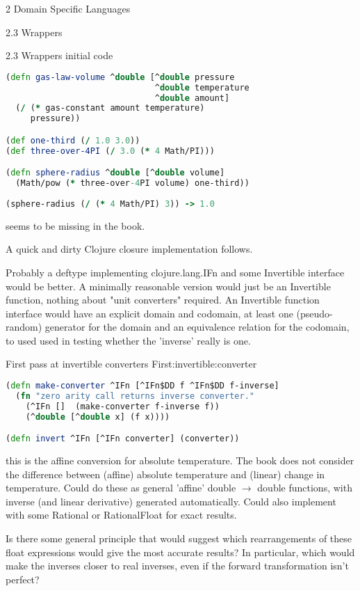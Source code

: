 \documentclass[12pt]{PalisadesLakesBook}
\begin{document}
\begin{plSection}{2 Domain Specific Languages}
\begin{plSection}{2.3 Wrappers}
\begin{plSection}{2.3 Wrappers initial code}
\begin{plListing}
\begin{lstlisting}[language=clojure]
(defn gas-law-volume ^double [^double pressure 
                              ^double temperature 
                              ^double amount]
  (/ (* gas-constant amount temperature)
     pressure))

(def one-third (/ 1.0 3.0))
(def three-over-4PI (/ 3.0 (* 4 Math/PI)))

(defn sphere-radius ^double [^double volume]
  (Math/pow (* three-over-4PI volume) one-third)) 
  
(sphere-radius (/ (* 4 Math/PI) 3)) -> 1.0
\end{lstlisting}
\end{plListing}

 seems to be missing
in the book.

A quick and dirty Clojure closure
implementation follows.

\TODO Probably a {\clojureFont deftype}
implementing {\clojureFont clojure.lang.IFn}
and some {\clojureFont Invertible} interface would be better.
A minimally reasonable version would just be an 
{\clojureFont Invertible}
function, nothing about "unit converters" required.
An {\clojureFont Invertible} function interface would 
have an explicit domain and codomain, 
at least one (pseudo-random) generator for the domain and
an equivalence relation for the codomain, to used used in
testing whether the 'inverse' really is one.
 
\begin{plListing}
{First pass at invertible converters}
{First:invertible:converter}
\begin{lstlisting}[language=clojure]
(defn make-converter ^IFn [^IFn$DD f ^IFn$DD f-inverse]
  (fn "zero arity call returns inverse converter."
    (^IFn []  (make-converter f-inverse f))
    (^double [^double x] (f x))))

(defn invert ^IFn [^IFn converter] (converter))
\end{lstlisting}
\end{plListing}

\NOTE this is the affine conversion for absolute temperature.
The book does not consider the difference between (affine) 
absolute temperature and (linear) change in temperature.
Could do these as general 'affine' 
{\javaFont double} $\rightarrow$ {\javaFont double} functions,
with inverse (and linear derivative) generated automatically.
Could also implement with some {\clojureFont Rational}
 or {\clojureFont RationalFloat}
for exact results.

\TODO Is there some general principle that would suggest which
rearrangements of these float expressions would give 
the most accurate results? In particular, which would make
the inverses closer to real inverses, even if the forward
transformation isn't perfect? 


\end{plSection}
\end{plSection}
\end{plSection}
\end{document}
